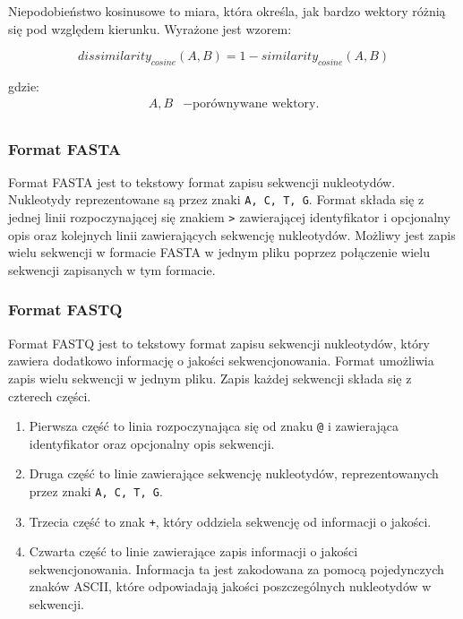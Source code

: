             Niepodobieństwo kosinusowe to miara, która określa, jak bardzo wektory różnią się pod względem kierunku. Wyrażone jest wzorem:

            \begin{equation}
                dissimilarity_{cosine}(A, B) = 1 - similarity_{cosine}(A, B)
                \label{Equation:CosineDissimilarity}
            \end{equation}

            gdzie:
            \begin{align*}
                A, B &- \text{porównywane wektory.} \\
            \end{align*}

        \subsubsection{Format FASTA}

            Format FASTA jest to tekstowy format zapisu sekwencji nukleotydów. Nukleotydy reprezentowane są przez znaki \texttt{A, C, T, G}. Format składa się z jednej linii rozpoczynającej się znakiem \texttt{>} zawierającej identyfikator i opcjonalny opis oraz kolejnych linii zawierających sekwencję nukleotydów. Możliwy jest zapis wielu sekwencji w formacie FASTA w jednym pliku poprzez połączenie wielu sekwencji zapisanych w tym formacie.

        \subsubsection{Format FASTQ}

            Format FASTQ jest to tekstowy format zapisu sekwencji nukleotydów, który zawiera dodatkowo informację o jakości sekwencjonowania. Format umożliwia zapis wielu sekwencji w jednym pliku. Zapis każdej sekwencji składa się z czterech części.
            \begin{enumerate}
                \item {
                    Pierwsza część to linia rozpoczynająca się od znaku \texttt{@} i zawierająca identyfikator oraz opcjonalny opis sekwencji.
                }
                \item {
                    Druga część to linie zawierające sekwencję nukleotydów, reprezentowanych przez znaki \texttt{A, C, T, G}.
                }
                \item {
                    Trzecia część to znak \texttt{+}, który oddziela sekwencję od informacji o jakości.
                }
                \item {
                    Czwarta część to linie zawierające zapis informacji o jakości sekwencjonowania. Informacja ta jest zakodowana za pomocą pojedynczych znaków ASCII, które odpowiadają jakości poszczególnych nukleotydów w sekwencji.
                }
            \end{enumerate}

